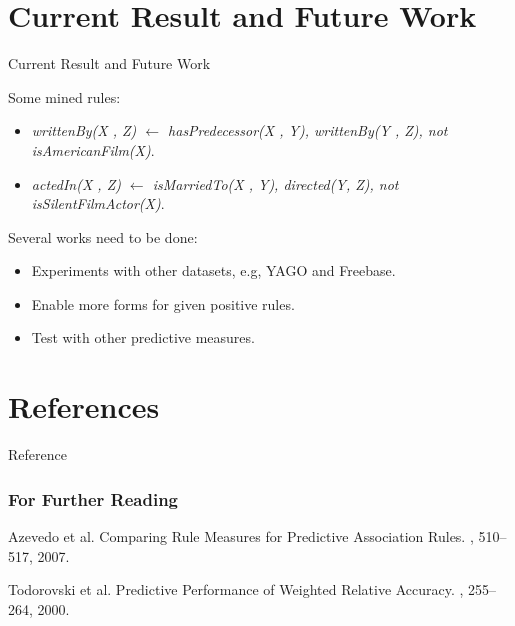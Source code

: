 \documentclass{beamer}
\begin{document}
\section{Current Result and Future Work}

\begin{frame}{Current Result and Future Work}

Some mined rules:
\begin{itemize}
	\item {
		\textit{writtenBy(X , Z) $\leftarrow$ hasPredecessor(X , Y), writtenBy(Y , Z), not isAmericanFilm(X)}.
	}
	\item {
		\textit{actedIn(X , Z) $\leftarrow$ isMarriedTo(X , Y), directed(Y, Z), not isSilentFilmActor(X)}.
		\pause
	}
\end{itemize}

Several works need to be done:
\begin{itemize}
	\item Experiments with other datasets, e.g, YAGO and Freebase.
	\item Enable more forms for given positive rules.
	\item Test with other predictive measures.
\end{itemize}

\end{frame}

\section*{References}

\begin{frame}{Reference}
  \frametitle<presentation>{For Further Reading}
  \begin{thebibliography}{10}

  \beamertemplatearticlebibitems

    Azevedo et al.
    \newblock Comparing Rule Measures for Predictive Association Rules.
    , 510--517,
    2007.

    Todorovski et al.
    \newblock Predictive Performance of Weighted Relative Accuracy.
    , 255--264,
    2000.

  \end{thebibliography}
\end{frame}
\end{document}
